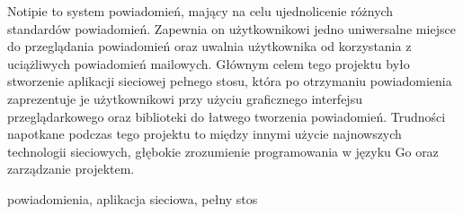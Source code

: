 \secondabstract
Notipie to system powiadomień,
mający na celu ujednolicenie
różnych standardów powiadomień.
Zapewnia on użytkownikowi
jedno uniwersalne miejsce
do przeglądania powiadomień
oraz uwalnia użytkownika od korzystania
z uciążliwych powiadomień mailowych.
Głównym celem tego projektu
było stworzenie aplikacji sieciowej pełnego stosu,
która po otrzymaniu powiadomienia
zaprezentuje je użytkownikowi
przy użyciu graficznego interfejsu przeglądarko\-wego
oraz biblioteki do łatwego tworzenia powiadomień.
Trudności napotkane podczas tego projektu
to między innymi
użycie najnowszych technologii sieciowych,
głębokie zrozumienie programowania w języku Go
oraz zarządzanie projektem.

\secondkeywords powiadomienia, aplikacja sieciowa, pełny stos
